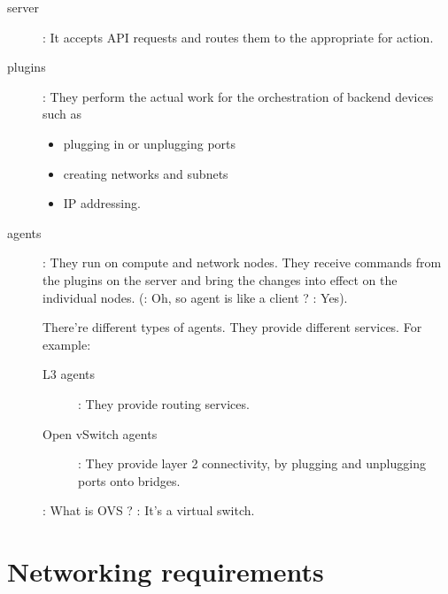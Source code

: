 \documentclass[dvipsnames]{article}
\begin{document}
\begin{description}
\item[server] : It accepts API requests and routes them to the appropriate
   for action.
\item[plugins] : They perform the actual work for the orchestration of backend devices such as
  \begin{itemize}
  \item plugging in or unplugging ports
  \item creating networks and subnets
  \item IP addressing.
  \end{itemize}
\item[agents] : They run on compute and network nodes. They receive commands
  from the plugins on the server and bring the changes into effect on the
  individual nodes. (: Oh, so agent is like a client ?
  : Yes).

  There're different types of agents. They provide different services. For example:
  \begin{description}
  \item[L3 agents] : They provide routing services.
  \item[Open vSwitch agents] : They provide layer 2 connectivity, by plugging
    and unplugging ports onto  bridges.
  \end{description}
  : What is OVS ? : It's a virtual switch.

\end{description}


\section{Networking requirements}



\end{document}
